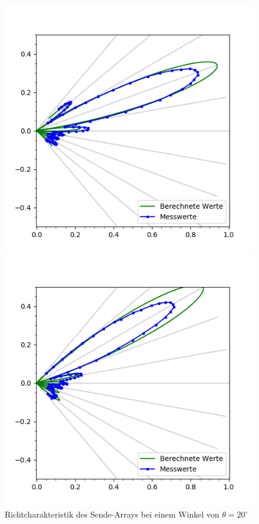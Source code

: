\begin{figure}[htb]
\begin{minipage}{0.5\textwidth}
\includegraphics[width=\textwidth]{graphics/plot_test_characteristic_rect_20_polar.png}
\caption{Richtcharakteristik des Sende-Arrays bei einem Winkel von $\theta = 20^{\circ}$} %
\label{fig:plot_test_characteristic_rect_20_polar}
%
\end{minipage}
\begin{minipage}{0.5\textwidth}
\includegraphics[width=\textwidth]{graphics/plot_test_characteristic_rect_30_polar.png}

\end{minipage}
\end{figure}
